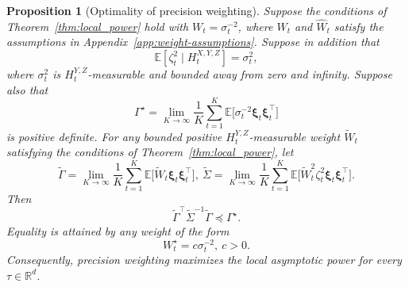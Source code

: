 \documentclass[12pt]{article}
\def\E{\mathbb{E}}
\newtheorem{proposition}[theorem]{Proposition}
\numberwithin{equation}{section}
\begin{document}
\begin{proposition}[Optimality of precision weighting]
\label{prop:vector-precision-optimal}
Suppose the conditions of Theorem~\ref{thm:local_power} hold with \(W_t=\sigma_t^{-2}\), where \(W_t\) and \(\hat W_t\) satisfy the assumptions in Appendix~\ref{app:weight-assumptions}. Suppose in addition that
\begin{equation}
    \E[
        \zeta_t^2
        \mid H_t^{X,Y,Z}]
    =
    \sigma_t^2,
    \label{eq:variance-history-only}
\end{equation}
where $\sigma_t^2$ is $H_t^{Y,Z}$-measurable and bounded away from zero and
infinity. Suppose also that
\begin{equation}
    \Gamma^\star
    =
    \lim_{K\to\infty}
    \frac{1}{K}\sum_{t=1}^K
    \E\big[
        \sigma_t^{-2}
        \boldsymbol{\xi}_t\boldsymbol{\xi}_t^\top
    \big]
    \label{eq:Gamma-star}
\end{equation}
is positive definite. For any bounded positive $H_t^{Y,Z}$-measurable weight
$\tilde W_t$ satisfying the conditions of Theorem~\ref{thm:local_power}, let
\begin{equation}
    \tilde\Gamma
    =
    \lim_{K\to\infty}
    \frac{1}{K}\sum_{t=1}^K
    \E\big[
        \tilde W_t
        \boldsymbol{\xi}_t\boldsymbol{\xi}_t^\top
    \big],
    ~
    \tilde\Sigma
    =
    \lim_{K\to\infty}
    \frac{1}{K}\sum_{t=1}^K
    \E\big[
        \tilde W_t^2\zeta_t^2
        \boldsymbol{\xi}_t\boldsymbol{\xi}_t^\top
    \big].
    \label{eq:alternative-weight-limits}
\end{equation}
Then
\begin{equation}
    {
    \tilde\Gamma^\top
    \tilde\Sigma^{-1}
    \tilde\Gamma
    \preceq
    \Gamma^\star.}
    \label{eq:precision-loewner-bound}
\end{equation}
Equality is attained by any weight of the form
\begin{equation}
    W_t^\star=c\sigma_t^{-2},
    ~ c>0.
    \label{eq:optimal-precision-weight}
\end{equation}
Consequently, precision weighting maximizes the local asymptotic power for
every $\tau\in\mathbb R^d$.
\end{proposition}
\end{document}

